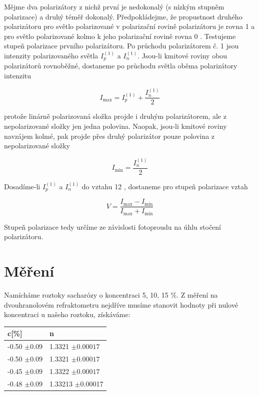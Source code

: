 \documentclass[czech,11pt,a4paper]{article}
\begin{document}
\begin{multicols}{2}
	
	Mějme dva polarizátory z nichž první je nedokonalý (s nízkým stupněm polarizace) a druhý téměř dokonalý. Předpokládejme, že propustnost druhého polarizátoru pro světlo polarizované v polarizační rovině polarizátoru je rovna 1 a pro světlo polarizované kolmo k jeho polarizační rovině rovna 0 . Testujeme stupeň polarizace prvního polarizátoru. Po průchodu polarizátorem č. 1 jsou intenzity polarizovaného světla $I_{p}^{(1)}$ a $I_{n}^{(1)}$. Jsou-li kmitové roviny obou polarizátorů rovnoběžné, dostaneme po průchodu světla oběma polarizátory intenzitu
	
	\begin{equation}
		I_{\max }=I_{p}^{(1)}+\frac{I_{n}^{(1)}}{2}
	\end{equation}
	
	
	protože linárně polarizovaná složka projde i druhým polarizátorem, ale z nepolarizované složky jen jedna polovina. Naopak, jsou-li kmitové roviny navzájem kolmé, pak projde přes druhý polarizátor pouze polovina z nepolarizované složky
	
	
	\begin{equation}
		I_{\min }=\frac{I_{n}^{(1)}}{2}
	\end{equation}
	
	
	Dosadíme-li $I_{p}^{(1)}$ a $I_{n}^{(1)}$ do vztahu 12 , dostaneme pro stupeň polarizace vztah
	
	\begin{equation}
		V=\frac{I_{\max }-I_{\min }}{I_{\max }+I_{\min }}
	\end{equation}
	
	
	Stupeň polarizace tedy určíme ze závislosti fotoproudu na úhlu stočení polarizátoru.
	
	
	
	
		\section{Měření}
		Namícháme roztoky sacharózy o koncentraci 5, 10, 15 \%. Z měření na dvouhranolovém refraktometru nejdříve musíme stanovit hodnoty při nulové koncentraci u našeho roztoku, získáváme:
		
		\begin{tabular}{l|l}
			c[\%] & n \\	\hline		
			-0.50 $\pm 0.09 $ & 1.3321 $\pm 0.00017$ \\
			-0.50 $\pm 0.09 $& 1.3321 $\pm 0.00017$\\
			-0.45 $\pm 0.09 $& 1.3322 $\pm 0.00017$\\ \hline
			-0.48 $\pm$0.09 & 1.33213 $\pm$0.00017 \\
			

\end{tabular}
\end{multicols}
\end{document}
